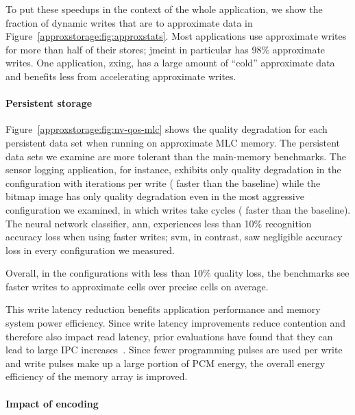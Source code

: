 To put these speedups in the context of the whole application, we
show the fraction of
dynamic writes that are to approximate data in
Figure~\ref{approxstorage:fig:approxstats}.
Most applications use approximate writes for
more than half of their stores; \textsf{jmeint} in particular has 98\%
approximate writes. One application, \textsf{zxing}, has a large amount of
``cold'' approximate data and benefits less from accelerating
approximate writes.


\paragraph{Persistent storage}

Figure~\ref{approxstorage:fig:nv-qos-mlc} shows the quality degradation for each
persistent data set when running on approximate MLC memory. The
persistent data sets we examine are more tolerant than the
main-memory benchmarks. The sensor logging application, for instance,
exhibits only  quality degradation in the
configuration with 
iterations per write ( faster than the baseline) while the bitmap
image has only  quality degradation even in the most aggressive
configuration we examined, in which writes take
 cycles (
faster than the baseline).
The neural network classifier, \textsf{ann}, experiences less than 10\%
recognition accuracy loss when using  faster
writes; \textsf{svm}, in contrast, saw negligible accuracy loss in every
configuration we measured.

\vskip 12pt
\noindent
Overall, in the configurations with less than 10\% quality loss, the benchmarks
see  faster writes to approximate cells over precise cells on
average.

This write latency reduction benefits application performance and memory
system power efficiency. Since write latency improvements reduce contention
and therefore also impact read latency, prior evaluations have found that they
can lead to large IPC increases~\cite{improvingwrites,powertokens}. Since fewer
programming pulses are used per write and write pulses make up a large portion
of PCM energy, the overall energy efficiency of the memory array is improved.

\paragraph{Impact of encoding}

